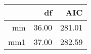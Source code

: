 \begin{table}[ht]
\centering
\begin{tabular}{rrr}
  \hline
 & df & AIC \\ 
  \hline
mm & 36.00 & 281.01 \\ 
  mm1 & 37.00 & 282.59 \\ 
   \hline
\end{tabular}
\end{table}
